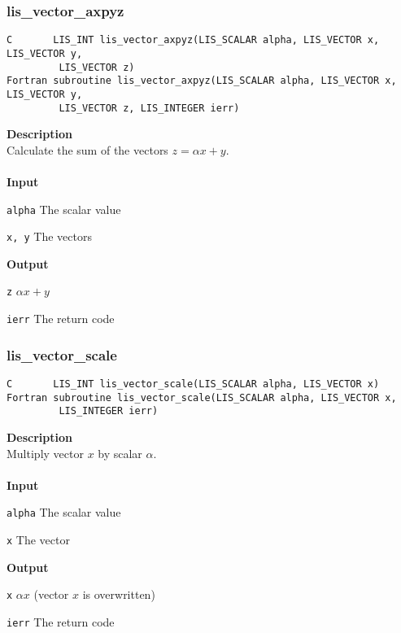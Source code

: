 \documentclass[a4paper]{article}
\newcommand{\namelistlabel}[1]{\mbox{#1}\hfill}
\newenvironment{namelist}[1]{%
\begin{list}{}
  {\let\makelabel\namelistlabel
  \settowidth{\labelwidth}{#1}
  \setlength{\leftmargin}{1.1\labelwidth}}
  }{%
\end{list}}
\begin{document}
\newpage
\subsubsection{lis\_vector\_axpyz}
\begin{screen}
\verb|C       LIS_INT lis_vector_axpyz(LIS_SCALAR alpha, LIS_VECTOR x, LIS_VECTOR y,|\\
\verb|         LIS_VECTOR z)|\\
\verb|Fortran subroutine lis_vector_axpyz(LIS_SCALAR alpha, LIS_VECTOR x, LIS_VECTOR y,|\\
\verb|         LIS_VECTOR z, LIS_INTEGER ierr)|
\end{screen}
{\bf Description}\\
\indent
Calculate the sum of the vectors $z = \alpha x + y$.
\\ \\
\noindent
{\bf Input}
\begin{namelist}{XXXXXXXXXXXXXXXXXXXX}
\item[\tt alpha] The scalar value
\item[\tt x, y] The vectors
\end{namelist}
{\bf Output}
\begin{namelist}{XXXXXXXXXXXXXXXXXXXX}
\item[\tt z] $\alpha x + y$
\item[\tt ierr] The return code
\end{namelist}

\subsubsection{lis\_vector\_scale}
\begin{screen}
\verb|C       LIS_INT lis_vector_scale(LIS_SCALAR alpha, LIS_VECTOR x)|
\verb|Fortran subroutine lis_vector_scale(LIS_SCALAR alpha, LIS_VECTOR x,|\\
\verb|         LIS_INTEGER ierr)|
\end{screen}
{\bf Description}\\
\indent
Multiply vector $x$ by scalar $\alpha$.
\\ \\
\noindent
{\bf Input}
\begin{namelist}{XXXXXXXXXXXXXXXXXXXX}
\item[\tt alpha] The scalar value
\item[\tt x] The vector
\end{namelist}
{\bf Output}
\begin{namelist}{XXXXXXXXXXXXXXXXXXXX}
\item[\tt x] $\alpha x$ (vector $x$ is overwritten)
\item[\tt ierr] The return code
\end{namelist}
\end{document}

